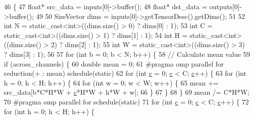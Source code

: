 \begin{DoxyCode}
46                                                              \{
47         \textcolor{keywordtype}{float}* src\_data = inputs[0]->buffer();
48         \textcolor{keywordtype}{float}* dst\_data = outputs[0]->buffer();
49 
50         SizeVector dims = inputs[0]->getTensorDesc().getDims();
51 
52         \textcolor{keywordtype}{int} N = \textcolor{keyword}{static\_cast<}\textcolor{keywordtype}{int}\textcolor{keyword}{>}((dims.size() > 0) ? dims[0] : 1);
53         \textcolor{keywordtype}{int} C = \textcolor{keyword}{static\_cast<}\textcolor{keywordtype}{int}\textcolor{keyword}{>}((dims.size() > 1) ? dims[1] : 1);
54         \textcolor{keywordtype}{int} H = \textcolor{keyword}{static\_cast<}\textcolor{keywordtype}{int}\textcolor{keyword}{>}((dims.size() > 2) ? dims[2] : 1);
55         \textcolor{keywordtype}{int} W = \textcolor{keyword}{static\_cast<}\textcolor{keywordtype}{int}\textcolor{keyword}{>}((dims.size() > 3) ? dims[3] : 1);
56 
57         \textcolor{keywordflow}{for} (\textcolor{keywordtype}{int} b = 0; b < N; b++) \{
58             \textcolor{comment}{// Calculate mean value}
59             \textcolor{keywordflow}{if} (across\_channels) \{
60                 \textcolor{keywordtype}{double} mean = 0;
61 \textcolor{preprocessor}{                #pragma omp parallel for reduction(+ : mean) schedule(static)}
62                 \textcolor{keywordflow}{for} (\textcolor{keywordtype}{int} \hyperlink{CMakeCache_8txt_aac1d6a1710812201527c735f7c6afbaa}{c} = 0; \hyperlink{CMakeCache_8txt_aac1d6a1710812201527c735f7c6afbaa}{c} < C; \hyperlink{CMakeCache_8txt_aac1d6a1710812201527c735f7c6afbaa}{c}++) \{
63                     \textcolor{keywordflow}{for} (\textcolor{keywordtype}{int} h = 0; h < H; h++) \{
64                         \textcolor{keywordflow}{for} (\textcolor{keywordtype}{int} w = 0; w < W; w++) \{
65                             mean += src\_data[b*C*H*W + \hyperlink{CMakeCache_8txt_aac1d6a1710812201527c735f7c6afbaa}{c}*H*W + h*W + w];
66                         \}
67                     \}
68                 \}
69                 mean /= C*H*W;
70 \textcolor{preprocessor}{                #pragma omp parallel for schedule(static)}
71                 \textcolor{keywordflow}{for} (\textcolor{keywordtype}{int} \hyperlink{CMakeCache_8txt_aac1d6a1710812201527c735f7c6afbaa}{c} = 0; \hyperlink{CMakeCache_8txt_aac1d6a1710812201527c735f7c6afbaa}{c} < C; \hyperlink{CMakeCache_8txt_aac1d6a1710812201527c735f7c6afbaa}{c}++) \{
72                     \textcolor{keywordflow}{for} (\textcolor{keywordtype}{int} h = 0; h < H; h++) \{

\end{DoxyCode}

